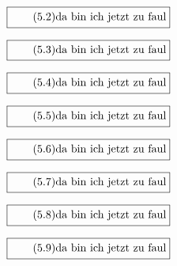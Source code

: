 \documentclass[11pt]{article}
\newcommand{\1}{ {\mathds{1}} }
\begin{document}
		\begin{equation}
			\boxed{
				\tag{5.2}
				\begin{split}
					\text{da bin ich jetzt zu faul}
				\end{split}
			}
		\end{equation}

		\begin{equation}
			\boxed{
				\tag{5.3}
				\begin{split}
					\text{da bin ich jetzt zu faul}
				\end{split}
			}
		\end{equation}

		\begin{equation}
			\boxed{
				\tag{5.4}
				\begin{split}
					\text{da bin ich jetzt zu faul}
				\end{split}
			}
		\end{equation}
		
		\begin{equation}
			\boxed{
				\tag{5.5}
				\begin{split}
					\text{da bin ich jetzt zu faul}
				\end{split}
			}
		\end{equation}

		\begin{equation}
			\boxed{
				\tag{5.6}
				\begin{split}
					\text{da bin ich jetzt zu faul}
				\end{split}
			}
		\end{equation}

		\begin{equation}
			\boxed{
				\tag{5.7}
				\begin{split}
					\text{da bin ich jetzt zu faul}
				\end{split}
			}
		\end{equation}

		\begin{equation}
			\boxed{
				\tag{5.8}
				\begin{split}
					\text{da bin ich jetzt zu faul}
				\end{split}
			}
		\end{equation}

		\begin{equation}
			\boxed{
				\tag{5.9}
				\begin{split}
					\text{da bin ich jetzt zu faul}
				\end{split}
			}
		\end{equation}
\end{document}
